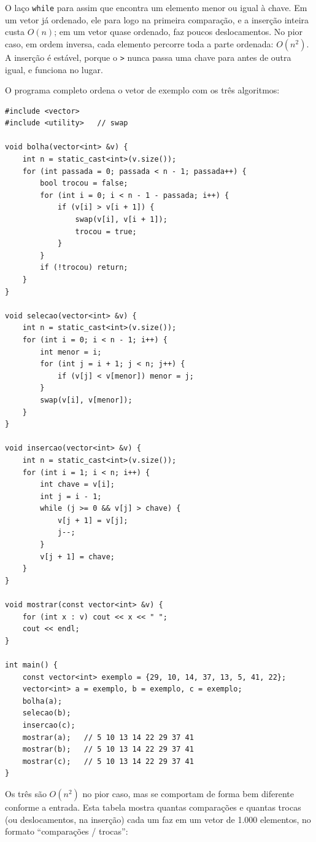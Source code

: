 O laço \texttt{while} para assim que encontra um elemento menor ou igual à chave. Em um vetor já ordenado, ele para logo na primeira comparação, e a inserção inteira custa $O(n)$; em um vetor quase ordenado, faz poucos deslocamentos. No pior caso, em ordem inversa, cada elemento percorre toda a parte ordenada: $O(n^2)$. A inserção é estável, porque o \texttt{>} nunca passa uma chave para antes de outra igual, e funciona no lugar.

O programa completo ordena o vetor de exemplo com os três algoritmos:

\begin{codigo}
\begin{Verbatim}[breaklines=true, breaksymbolleft={}, fontsize=\footnotesize]
#include <vector>
#include <utility>   // swap

void bolha(vector<int> &v) {
    int n = static_cast<int>(v.size());
    for (int passada = 0; passada < n - 1; passada++) {
        bool trocou = false;
        for (int i = 0; i < n - 1 - passada; i++) {
            if (v[i] > v[i + 1]) {
                swap(v[i], v[i + 1]);
                trocou = true;
            }
        }
        if (!trocou) return;
    }
}

void selecao(vector<int> &v) {
    int n = static_cast<int>(v.size());
    for (int i = 0; i < n - 1; i++) {
        int menor = i;
        for (int j = i + 1; j < n; j++) {
            if (v[j] < v[menor]) menor = j;
        }
        swap(v[i], v[menor]);
    }
}

void insercao(vector<int> &v) {
    int n = static_cast<int>(v.size());
    for (int i = 1; i < n; i++) {
        int chave = v[i];
        int j = i - 1;
        while (j >= 0 && v[j] > chave) {
            v[j + 1] = v[j];
            j--;
        }
        v[j + 1] = chave;
    }
}

void mostrar(const vector<int> &v) {
    for (int x : v) cout << x << " ";
    cout << endl;
}

int main() {
    const vector<int> exemplo = {29, 10, 14, 37, 13, 5, 41, 22};
    vector<int> a = exemplo, b = exemplo, c = exemplo;
    bolha(a);
    selecao(b);
    insercao(c);
    mostrar(a);   // 5 10 13 14 22 29 37 41
    mostrar(b);   // 5 10 13 14 22 29 37 41
    mostrar(c);   // 5 10 13 14 22 29 37 41
}
\end{Verbatim}
\end{codigo}

Os três são $O(n^2)$ no pior caso, mas se comportam de forma bem diferente conforme a entrada. Esta tabela mostra quantas comparações e quantas trocas (ou deslocamentos, na inserção) cada um faz em um vetor de 1.000 elementos, no formato ``comparações / trocas'':

